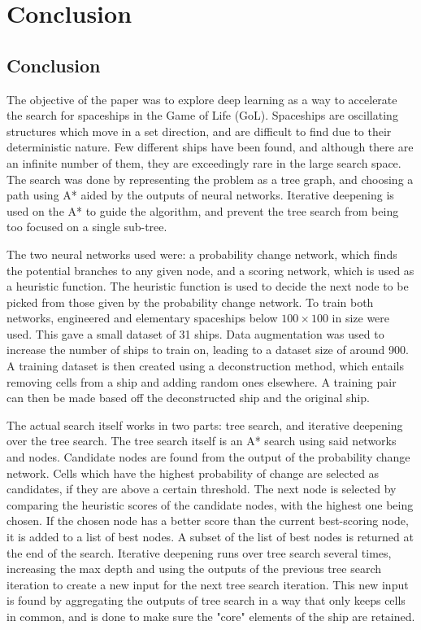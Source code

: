 \documentclass{l4proj}
\begin{document}

\chapter{Conclusion}    

\section{Conclusion}

The objective of the paper was to explore deep learning as a way to accelerate the search for spaceships in the Game of Life (GoL). Spaceships are oscillating structures which move in a set direction, and are difficult to find due to their deterministic nature. Few different ships have been found, and although there are an infinite number of them, they are exceedingly rare in the large search space. The search was done by representing the problem as a tree graph, and choosing a path using A* aided by the outputs of neural networks. Iterative deepening is used on the A* to guide the algorithm, and prevent the tree search from being too focused on a single sub-tree.

The two neural networks used were: a probability change network, which finds the potential branches to any given node, and a scoring network, which is used as a heuristic function. The heuristic function is used to decide the next node to be picked from those given by the probability change network. To train both networks, engineered and elementary spaceships below $100 \times 100$ in size were used. This gave a small dataset of 31 ships. Data augmentation was used to increase the number of ships to train on, leading to a dataset size of around 900. A training dataset is then created using a deconstruction method, which entails removing cells from a ship and adding random ones elsewhere. A training pair can then be made based off the deconstructed ship and the original ship.

The actual search itself works in two parts: tree search, and iterative deepening over the tree search. The tree search itself is an A* search using said networks and nodes. Candidate nodes are found from the output of the probability change network. Cells which have the highest probability of change are selected as candidates, if they are above a certain threshold. The next node is selected by comparing the heuristic scores of the candidate nodes, with the highest one being chosen. If the chosen node has a better score than the current best-scoring node, it is added to a list of best nodes. A subset of the list of best nodes is returned at the end of the search. Iterative deepening runs over tree search several times, increasing the max depth and using the outputs of the previous tree search iteration to create a new input for the next tree search iteration. This new input is found by aggregating the outputs of tree search in a way that only keeps cells in common, and is done to make sure the "core" elements of the ship are retained.
\end{document}
